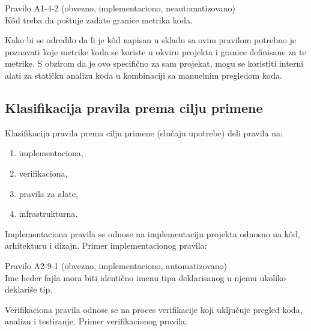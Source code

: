 \documentclass[12pt,oneside]{memoir}
\begin{document}
\begin{center}
\begin{tcolorbox}
Pravilo A1-4-2 (obvezno, implementaciono, neautomatizovano) \\
K\^{o}d treba da poštuje zadate granice metrika koda.
\end{tcolorbox}
\end{center}


  Kako bi se odredilo da li je k\^{o}d napisan u skladu sa ovim pravilom potrebno je poznavati koje metrike koda se koriste u okviru projekta i
  granice definisane za te metrike. S obzirom da je ovo specifično za sam projekat, mogu se koristiti interni alati za statičku analizu koda u kombinaciji
  sa manuelnim pregledom koda. 

\subsection{Klasifikacija pravila prema cilju primene}
Klasifikacija pravila prema cilju primene (slučaju upotrebe) deli pravila na:

\begin{enumerate}
  \item{implementaciona},
  \item{verifikaciona},
  \item{pravila za alate},
  \item{infrastrukturna}.
\end{enumerate}

Implementaciona pravila se odnose na implementaciju projekta odnosno na k\^{o}d, arhitekturu i dizajn.
Primer implementacionog pravila:

\begin{center}
\begin{tcolorbox}
Pravilo A2-9-1 (obvezno, implementaciono, automatizovano) \\
Ime heder fajla mora biti identično imenu tipa deklarisanog u njemu ukoliko deklariše tip.
\end{tcolorbox}
\end{center}


Verifikaciona pravila odnose se na proces verifikacije koji uključuje pregled koda, analizu i testiranje.
Primer verifikacionog pravila:
\end{document}
